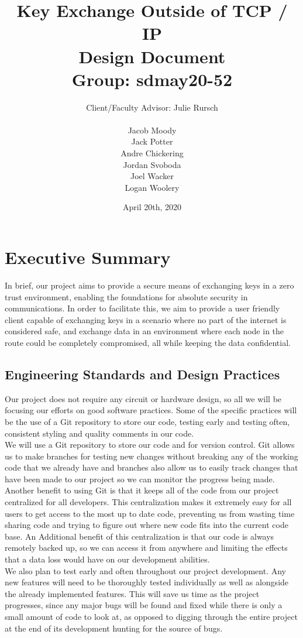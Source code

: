 \documentclass[11pt]{article}
\title{\textbf{Key Exchange Outside of TCP / IP}\\ 
{\normalsize Design Document} \\
{\normalsize Group: sdmay20-52}}
\author{Client/Faculty Advisor: Julie Rursch\\
\\
		Jacob Moody\\
		Jack Potter\\
		Andre Chickering\\
		Jordan Svoboda\\
		Joel Wacker\\
		Logan Woolery
}
\date{April 20th, 2020}
\begin{document}
\maketitle
\newpage
\section*{Executive Summary}

In brief, our project aims to provide a secure means of exchanging keys in a zero trust environment, enabling the foundations for absolute security in communications. In order to facilitate this, we aim to provide a user friendly client capable of exchanging keys in a scenario where no part of the internet is considered safe, and exchange data in an environment where each node in the route could be completely compromised, all while keeping the data confidential.

\subsection*{Engineering Standards and Design Practices}
Our project does not require any circuit or hardware design, so all we will be focusing our efforts on good software practices. Some of the specific practices will be the use of a Git repository to store our code, testing early and testing often, consistent styling and quality comments in our code. \\

We will use a Git repository to store our code and for version control. Git allows us to make branches for testing new changes without breaking any of the working code that we already have and branches also allow us to easily track changes that have been made to our project so we can monitor the progress being made. Another benefit to using Git is that it keeps all of the code from our project centralized for all developers. This centralization makes it extremely easy for all users to get access to the most up to date code, preventing us from wasting time sharing code and trying to figure out where new code fits into the current code base. An Additional benefit of this centralization is that our code is always remotely backed up, so we can access it from anywhere and limiting the effects that a data loss would have on our development abilities. \\

We also plan to test early and often throughout our project development. Any new features will need to be thoroughly tested individually as well as alongside the already implemented features. This will save us time as the project progresses, since any major bugs will be found and fixed while there is only a small amount of code to look at, as opposed to digging through the entire project at the end of its development hunting for the source of bugs. \\
\end{document}

